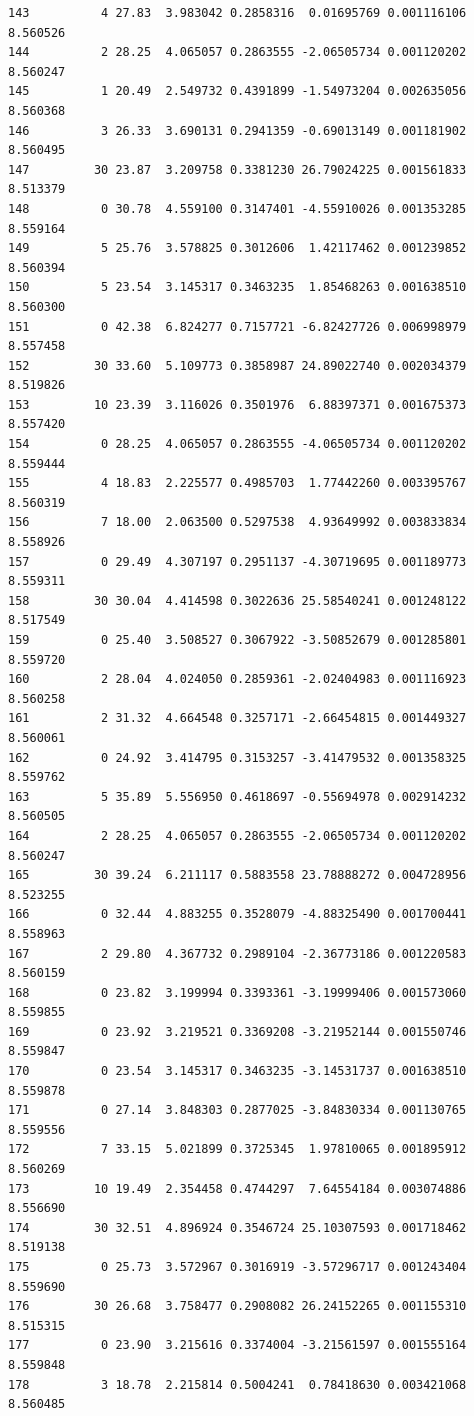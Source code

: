 \documentclass[]{book}
\theoremstyle{definition}
\theoremstyle{definition}
\theoremstyle{definition}
\theoremstyle{remark}
\begin{document}
\begin{verbatim}
143          4 27.83  3.983042 0.2858316  0.01695769 0.001116106 8.560526
144          2 28.25  4.065057 0.2863555 -2.06505734 0.001120202 8.560247
145          1 20.49  2.549732 0.4391899 -1.54973204 0.002635056 8.560368
146          3 26.33  3.690131 0.2941359 -0.69013149 0.001181902 8.560495
147         30 23.87  3.209758 0.3381230 26.79024225 0.001561833 8.513379
148          0 30.78  4.559100 0.3147401 -4.55910026 0.001353285 8.559164
149          5 25.76  3.578825 0.3012606  1.42117462 0.001239852 8.560394
150          5 23.54  3.145317 0.3463235  1.85468263 0.001638510 8.560300
151          0 42.38  6.824277 0.7157721 -6.82427726 0.006998979 8.557458
152         30 33.60  5.109773 0.3858987 24.89022740 0.002034379 8.519826
153         10 23.39  3.116026 0.3501976  6.88397371 0.001675373 8.557420
154          0 28.25  4.065057 0.2863555 -4.06505734 0.001120202 8.559444
155          4 18.83  2.225577 0.4985703  1.77442260 0.003395767 8.560319
156          7 18.00  2.063500 0.5297538  4.93649992 0.003833834 8.558926
157          0 29.49  4.307197 0.2951137 -4.30719695 0.001189773 8.559311
158         30 30.04  4.414598 0.3022636 25.58540241 0.001248122 8.517549
159          0 25.40  3.508527 0.3067922 -3.50852679 0.001285801 8.559720
160          2 28.04  4.024050 0.2859361 -2.02404983 0.001116923 8.560258
161          2 31.32  4.664548 0.3257171 -2.66454815 0.001449327 8.560061
162          0 24.92  3.414795 0.3153257 -3.41479532 0.001358325 8.559762
163          5 35.89  5.556950 0.4618697 -0.55694978 0.002914232 8.560505
164          2 28.25  4.065057 0.2863555 -2.06505734 0.001120202 8.560247
165         30 39.24  6.211117 0.5883558 23.78888272 0.004728956 8.523255
166          0 32.44  4.883255 0.3528079 -4.88325490 0.001700441 8.558963
167          2 29.80  4.367732 0.2989104 -2.36773186 0.001220583 8.560159
168          0 23.82  3.199994 0.3393361 -3.19999406 0.001573060 8.559855
169          0 23.92  3.219521 0.3369208 -3.21952144 0.001550746 8.559847
170          0 23.54  3.145317 0.3463235 -3.14531737 0.001638510 8.559878
171          0 27.14  3.848303 0.2877025 -3.84830334 0.001130765 8.559556
172          7 33.15  5.021899 0.3725345  1.97810065 0.001895912 8.560269
173         10 19.49  2.354458 0.4744297  7.64554184 0.003074886 8.556690
174         30 32.51  4.896924 0.3546724 25.10307593 0.001718462 8.519138
175          0 25.73  3.572967 0.3016919 -3.57296717 0.001243404 8.559690
176         30 26.68  3.758477 0.2908082 26.24152265 0.001155310 8.515315
177          0 23.90  3.215616 0.3374004 -3.21561597 0.001555164 8.559848
178          3 18.78  2.215814 0.5004241  0.78418630 0.003421068 8.560485

\end{verbatim}
\end{document}
